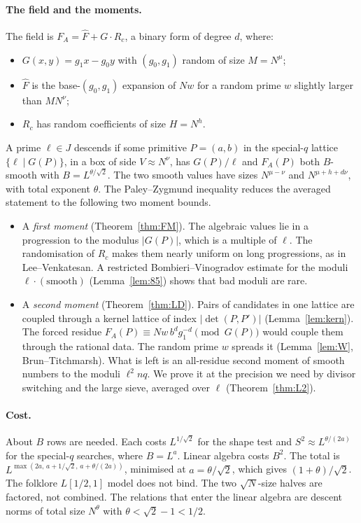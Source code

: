 \documentclass[11pt]{amsart}
\theoremstyle{definition}
\begin{document}
\paragraph{The field and the moments.} The field is $F_A=\hat F+G\cdot R_c$, a binary form of degree $d$,
where:
\begin{itemize}
\item $G(x,y)=g_1x-g_0y$ with $(g_0,g_1)$ random of size $M=N^\mu$;
\item $\hat F$ is the base-$(g_0,g_1)$ expansion of $Nw$ for a random prime $w$ slightly larger than $MN^\nu$;
\item $R_c$ has random coefficients of size $H=N^h$.
\end{itemize}
A prime $\ell\in J$ descends if some primitive $P=(a,b)$ in the special-$q$ lattice $\{\ell\mid G(P)\}$, in a box of side $V\approx
N^{\nu}$, has $G(P)/\ell$ and $F_A(P)$ both $B$-smooth with $B=L^{\theta/\sqrt2}$. The two smooth values have sizes
$N^{\mu-\nu}$ and $N^{\mu+h+d\nu}$, with total exponent $\theta$. The Paley--Zygmund inequality reduces the
averaged statement to the following two moment bounds.
\begin{itemize}
\item A \emph{first moment} (Theorem~\ref{thm:FM}). The algebraic values lie in a progression to the
  modulus $|G(P)|$, which is a multiple of $\ell$. The randomisation of $R_c$ makes them nearly uniform
  on long progressions, as in Lee--Venkatesan. A restricted Bombieri--Vinogradov estimate for the
  moduli $\ell\cdot(\text{smooth})$ (Lemma~\ref{lem:85}) shows that bad moduli are rare.
\item A \emph{second moment} (Theorem~\ref{thm:LD}). Pairs of candidates in one lattice are coupled
  through a kernel lattice of index $|\det(P,P')|$ (Lemma~\ref{lem:kern}). The forced residue
  $F_A(P)\equiv Nw\,b^dg_1^{-d}\pmod{G(P)}$ would couple them through the rational data. The random
  prime $w$ spreads it (Lemma~\ref{lem:W}, Brun--Titchmarsh). What is left is an all-residue second moment of smooth
  numbers to the moduli $\ell^2nq$. We prove it at the precision we need by divisor switching and the large
  sieve, averaged over $\ell$ (Theorem~\ref{thm:L2}).
\end{itemize}

\paragraph{Cost.} About $B$ rows are needed. Each costs $L^{1/\sqrt2}$ for the shape test and $S^2\approx
L^{\theta/(2a)}$ for the special-$q$ searches, where $B=L^a$. Linear algebra costs $B^2$. The total is
$L^{\max(2a,\,a+1/\sqrt2,\,a+\theta/(2a))}$, minimised at $a=\theta/\sqrt2$, which gives $(1+\theta)/\sqrt2$.
The folklore $L[1/2,1]$ model does not bind. The two $\sqrt N$-size halves are factored, not combined. The
relations that enter the linear algebra are descent norms of total size $N^{\theta}$ with
$\theta<\sqrt2-1<1/2$.
\end{document}
